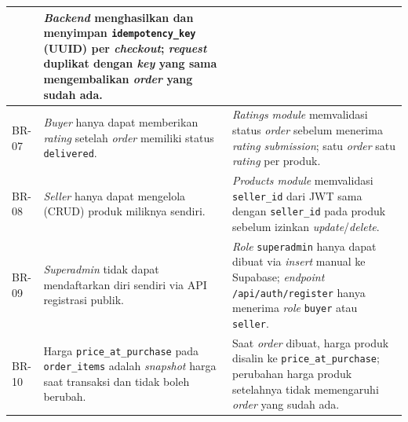 \begin{longtable}{|L{1cm}|L{7cm}|L{7cm}|}
        & \textit{Backend} menghasilkan dan menyimpan \texttt{idempotency\_key}
          (UUID) per \textit{checkout}; \textit{request} duplikat dengan \textit{key}
          yang sama mengembalikan \textit{order} yang sudah ada. \\
    \hline
    BR-07
        & \textit{Buyer} hanya dapat memberikan \textit{rating} setelah
          \textit{order} memiliki status \texttt{delivered}.
        & \textit{Ratings module} memvalidasi status \textit{order} sebelum
          menerima \textit{rating submission}; satu \textit{order} satu
          \textit{rating} per produk. \\
    \hline
    BR-08
        & \textit{Seller} hanya dapat mengelola (CRUD) produk miliknya sendiri.
        & \textit{Products module} memvalidasi \texttt{seller\_id} dari JWT sama
          dengan \texttt{seller\_id} pada produk sebelum izinkan \textit{update}/\textit{delete}. \\
    \hline
    BR-09
        & \textit{Superadmin} tidak dapat mendaftarkan diri sendiri via API
          registrasi publik.
        & \textit{Role} \texttt{superadmin} hanya dapat dibuat via \textit{insert}
          manual ke Supabase; \textit{endpoint} \texttt{/api/auth/register} hanya
          menerima \textit{role} \texttt{buyer} atau \texttt{seller}. \\
    \hline
    BR-10
        & Harga \texttt{price\_at\_purchase} pada \texttt{order\_items} adalah
          \textit{snapshot} harga saat transaksi dan tidak boleh berubah.
        & Saat \textit{order} dibuat, harga produk disalin ke
          \texttt{price\_at\_purchase}; perubahan harga produk setelahnya tidak
          memengaruhi \textit{order} yang sudah ada. \\
    \hline
\end{longtable}
